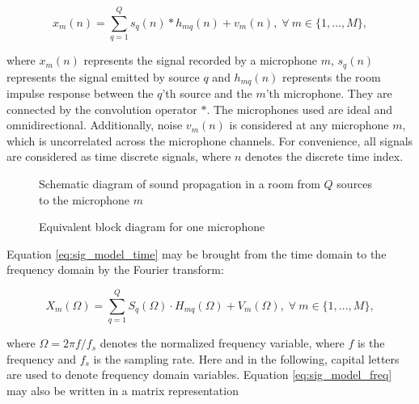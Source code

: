 \begin{equation}
x_m(n)=\sum^{Q}_{q=1}s_q(n) \ast h_{mq}(n) + v_m(n), \;  \forall \ m \in \{ 1,...,M\},
\label{eq:sig_model_time}
\end{equation}

where $x_m(n)$ represents the signal recorded by a microphone $m$, $s_q(n)$ represents the signal emitted by source $q$ and $h_{mq}(n)$ represents the room impulse response between the $q$'th source and the $m$'th microphone. They are connected by the convolution operator $\ast$. The microphones used are ideal and omnidirectional. Additionally, noise $v_m(n)$ is considered at any microphone $m$, which is uncorrelated across the microphone channels. For convenience, all signals are considered as time discrete signals, where $n$ denotes the discrete time index.\\


\begin{figure}[!t]
	\centering
	\begin{minipage}[t]{.45\textwidth}
		  \def\svgwidth{1\linewidth}
		  \small
		\caption{Schematic diagram of sound propagation in a room from $Q$ sources to the microphone $m$}
		\label{fig:sig_mode_doa}
	\end{minipage}%
	\hfill
	\begin{minipage}[t]{.45\textwidth}
		\centering
		

		\caption{Equivalent block diagram for one microphone}
		\label{fig:equiv_block}
	\end{minipage}
\end{figure}

\pagebreak

Equation \ref{eq:sig_model_time} may be brought from the time domain to the frequency domain by the Fourier transform:

\begin{equation}
X_m(\Omega)=\sum^{Q}_{q=1}S_q(\Omega) \cdot H_{mq}(\Omega) + V_m(\Omega), \; \forall \ m \in \{1,...,M\},
\label{eq:sig_model_freq}
\end{equation}

where $\Omega=2\pi f/f_s$ denotes the normalized frequency variable, where $f$ is the frequency and $f_s$ is the sampling rate. Here and in the following, capital letters are used to denote frequency domain variables. Equation \ref{eq:sig_model_freq} may also be written in a matrix representation

